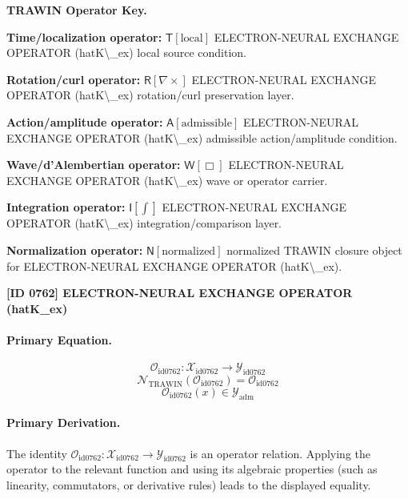 \par\vspace{0.45\baselineskip}
\noindent\begin{minipage}[t]{\linewidth}
\begingroup
\small
\raggedright
\textbf{TRAWIN Operator Key.}\par
\noindent\textbf{Time/localization operator:} $\mathsf{T}\!\left[\mathrm{local}\right]$ ELECTRON-NEURAL EXCHANGE OPERATOR (hatK\textbackslash{}\_ex) local source condition.\par
\noindent\textbf{Rotation/curl operator:} $\mathsf{R}\!\left[\nabla\times\right]$ ELECTRON-NEURAL EXCHANGE OPERATOR (hatK\textbackslash{}\_ex) rotation/curl preservation layer.\par
\noindent\textbf{Action/amplitude operator:} $\mathsf{A}\!\left[\mathrm{admissible}\right]$ ELECTRON-NEURAL EXCHANGE OPERATOR (hatK\textbackslash{}\_ex) admissible action/amplitude condition.\par
\noindent\textbf{Wave/d'Alembertian operator:} $\mathsf{W}\!\left[\Box\right]$ ELECTRON-NEURAL EXCHANGE OPERATOR (hatK\textbackslash{}\_ex) wave or operator carrier.\par
\noindent\textbf{Integration operator:} $\mathsf{I}\!\left[\int\right]$ ELECTRON-NEURAL EXCHANGE OPERATOR (hatK\textbackslash{}\_ex) integration/comparison layer.\par
\noindent\textbf{Normalization operator:} $\mathsf{N}\!\left[\mathrm{normalized}\right]$ normalized TRAWIN closure object for ELECTRON-NEURAL EXCHANGE OPERATOR (hatK\textbackslash{}\_ex).\par
\endgroup
\end{minipage}

\clearpage
\noindent\textbf{[ID 0762] ELECTRON-NEURAL EXCHANGE OPERATOR (hatK\_ex)}\par
\vspace{0.35em}
\paragraph{Primary Equation.}
\[
\mathcal{O}_{\mathrm{id0762}}:\mathcal{X}_{\mathrm{id0762}}\longrightarrow\mathcal{Y}_{\mathrm{id0762}}
\]
\[
\mathcal{N}_{\mathrm{TRAWIN}}(\mathcal{O}_{\mathrm{id0762}})=\mathcal{O}_{\mathrm{id0762}}
\]
\[
\mathcal{O}_{\mathrm{id0762}}(x)\in\mathcal{Y}_{\mathrm{adm}}
\]

\paragraph{Primary Derivation.}
The identity \( \mathcal{O}_{\mathrm{id0762}}:\mathcal{X}_{\mathrm{id0762}}\longrightarrow\mathcal{Y}_{\mathrm{id0762}} \) is an operator relation. Applying the operator to the relevant function and using its algebraic properties (such as linearity, commutators, or derivative rules) leads to the displayed equality.
